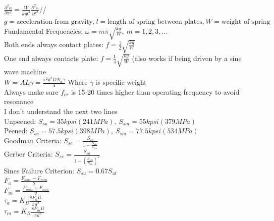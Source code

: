 \documentclass[11pt, fleqn]{article}
\begin{document}
$\frac{\partial^2u}{\partial x^2} = \frac{W}{kgl^2}\frac{\partial^2u}{\partial t^2}$//
$g = \text{acceleration from gravity,} \: l = \text{length of spring between plates,} \: W = \text{weight of spring}$\\
Fundamental Frequencies: $\omega = m\pi\sqrt{\frac{kg}{W}}, \: m = 1,2,3,...$\\
Both ends always contact plates: $f = \frac{1}{2}\sqrt{\frac{kg}{W}}$\\
One end always contacts plate: $f = \frac{1}{4}\sqrt{\frac{kg}{W}}$ (also works if being driven by a sine wave machine\\
$W = AL\gamma = \frac{\pi^2 d^2 DN_a\gamma}{4}$ Where $\gamma$ is specific weight\\
Always make sure $f_{cr}$ is 15-20 times higher than operating frequency to avoid resonance\\
I don't understand the next two lines\\
Unpeened: $S_{sa} = 35kpsi (241MPa), \: S_{sm} = 55kpsi (379MPa)$\\
Peened: $S_{sa} = 57.5kpsi (398MPa), \: S_{sm} = 77.5kpsi (534MPa)$\\
Goodman Criteria: $S_{se} = \frac{S_{sa}}{1-\frac{S_{sm}}{S_{su}}}$\\
Gerber Criteria: $S_{se} = \frac{S_{sa}}{1-(\frac{S_{sm}}{S_{su}})^2}$\\
Sines Failure Criterion: $S_{su} = 0.67S_{ut}$\\
$F_a = \frac{F_{max} - F_{min}}{2}$\\
$F_m = \frac{F_{max} + F_{min}}{2}$\\
$\tau_a = K_B\frac{8F_aD}{\pi d^3}$\\
$\tau_m = K_B\frac{8F_mD}{\pi d^3}$\\
\end{document}

